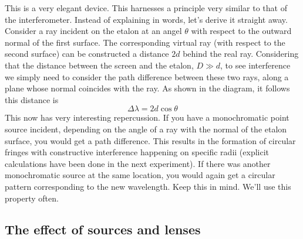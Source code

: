 This is a very elegant device. This harnesses a principle very similar
to that of the interferometer. Instead of explaining in words, let's
derive it straight away. Consider
a ray incident on the etalon at an angel $\theta$ with respect to
the outward normal of the first surface. The corresponding virtual ray
(with respect to the second surface) can be constructed a distance
$2d$ behind the real ray. Considering that the distance between the
screen and the etalon, $D\gg d$, to see interference we simply need
to consider the path difference between these two rays, along a plane
whose normal coincides with the ray. As shown in the diagram, it follows
this distance is 
\[
\Delta\lambda=2d\cos\theta
\]
This now has very interesting repercussion. If you have a monochromatic
point source incident, depending on the angle of a ray with the normal
of the etalon surface, you would get a path difference. This results
in the formation of circular fringes with constructive interference
happening on specific radii (explicit calculations have been done
in the next experiment). If there was another monochromatic source
at the same location, you would again get a circular pattern corresponding
to the new wavelength. Keep this in mind. We'll use this property
often.


\subsection{The effect of sources and lenses}


